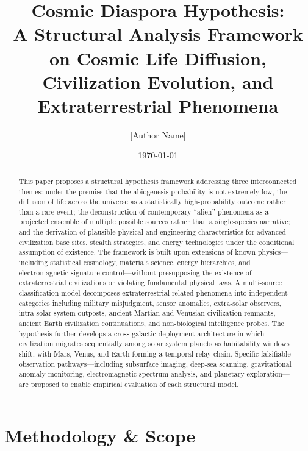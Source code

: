 \documentclass[aps,prd,twocolumn,superscriptaddress,nofootinbib]{revtex4-2}
\begin{document}
\title{Cosmic Diaspora Hypothesis:\\
A Structural Analysis Framework on Cosmic Life Diffusion,\\
Civilization Evolution, and Extraterrestrial Phenomena}

\author{[Author Name]}
\affiliation{[Affiliation]}

\date{\today}

\begin{abstract}
This paper proposes a structural hypothesis framework addressing three interconnected themes: under the premise that the abiogenesis probability is not extremely low, the diffusion of life across the universe as a statistically high-probability outcome rather than a rare event; the deconstruction of contemporary ``alien'' phenomena as a projected ensemble of multiple possible sources rather than a single-species narrative; and the derivation of plausible physical and engineering characteristics for advanced civilization base sites, stealth strategies, and energy technologies under the conditional assumption of existence. The framework is built upon extensions of known physics---including statistical cosmology, materials science, energy hierarchies, and electromagnetic signature control---without presupposing the existence of extraterrestrial civilizations or violating fundamental physical laws. A multi-source classification model decomposes extraterrestrial-related phenomena into independent categories including military misjudgment, sensor anomalies, extra-solar observers, intra-solar-system outposts, ancient Martian and Venusian civilization remnants, ancient Earth civilization continuations, and non-biological intelligence probes. The hypothesis further develops a cross-galactic deployment architecture in which civilization migrates sequentially among solar system planets as habitability windows shift, with Mars, Venus, and Earth forming a temporal relay chain. Specific falsifiable observation pathways---including subsurface imaging, deep-sea scanning, gravitational anomaly monitoring, electromagnetic spectrum analysis, and planetary exploration---are proposed to enable empirical evaluation of each structural model.
\end{abstract}

\maketitle

\section{Methodology \& Scope}\label{sec:methodology}
\end{document}
